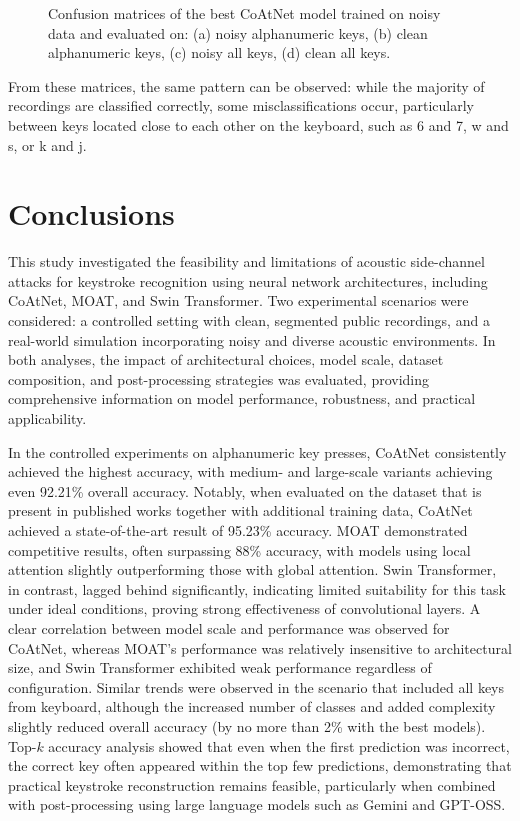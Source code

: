 \documentclass[a4paper,11pt,twoside]{report}
\theoremstyle{definition}
\begin{document}
\begin{figure}[h!]
  \caption{Confusion matrices of the best CoAtNet model trained on noisy data and evaluated on: (a) noisy alphanumeric keys, (b) clean alphanumeric keys, (c) noisy all keys, (d) clean all keys.}
  \label{fig:confusion_matrices_noisy}
\end{figure}

From these matrices, the same pattern can be observed: while the majority of recordings are classified correctly, some misclassifications occur, particularly between keys located close to each other on the keyboard, such as 6 and 7, w and s, or k and j.


\chapter{Conclusions}

This study investigated the feasibility and limitations of acoustic side-channel attacks for keystroke recognition using neural network architectures, including CoAtNet, MOAT, and Swin Transformer. Two experimental scenarios were considered: a controlled setting with clean, segmented public recordings, and a real-world simulation incorporating noisy and diverse acoustic environments. In both analyses, the impact of architectural choices, model scale, dataset composition, and post-processing strategies was evaluated, providing comprehensive information on model performance, robustness, and practical applicability.

In the controlled experiments on alphanumeric key presses, CoAtNet consistently achieved the highest accuracy, with medium- and large-scale variants achieving even 92.21\% overall accuracy. Notably, when evaluated on the dataset that is present in published works together with additional training data, CoAtNet achieved a state-of-the-art result of 95.23\% accuracy. MOAT demonstrated competitive results, often surpassing 88\% accuracy, with models using local attention slightly outperforming those with global attention. Swin Transformer, in contrast, lagged behind significantly, indicating limited suitability for this task under ideal conditions, proving strong effectiveness of convolutional layers. A clear correlation between model scale and performance was observed for CoAtNet, whereas MOAT’s performance was relatively insensitive to architectural size, and Swin Transformer exhibited weak performance regardless of configuration. Similar trends were observed in the scenario that included all keys from keyboard, although the increased number of classes and added complexity slightly reduced overall accuracy (by no more than 2\% with the best models). Top-$k$ accuracy analysis showed that even when the first prediction was incorrect, the correct key often appeared within the top few predictions, demonstrating that practical keystroke reconstruction remains feasible, particularly when combined with post-processing using large language models such as Gemini and GPT-OSS.
\end{document}

